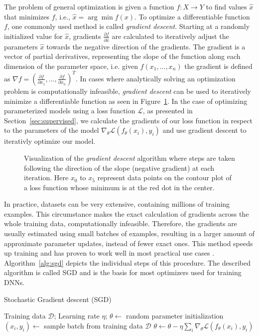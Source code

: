 The problem of general optimization is given a function $f: X \to  Y$ to find values $\hat{x}$ that minimizes $f$, i.e., $\hat{x} = \arg \min f(x)$.
To optimize a differentiable function $f$, one commonly used method is called \textit{gradient descent}. Starting at a randomly initialized value for $\hat{x}$, gradients $\frac{\partial f}{\partial \hat{x}}$ are calculated to iteratively adjust the parameters $\hat{x}$ towards the negative direction of the gradients. The gradient is a vector of partial derivatives, representing the slope of the function along each dimension of the parameter space, i.e. given $f(x_1,...,x_n)$ the gradient is defined as $\nabla f = \left(\frac{\partial f}{\partial x_1}, ..., \frac{\partial f}{\partial x_n} \right)^T$. In cases where analytically solving an optimization problem is computationally infeasible, \textit{gradient descent} can be used to iteratively minimize a differentiable function as seen in Figure~\ref{fig:gd}. In the case of optimizing parameterized models using a loss function $\mathcal{L}$, as presented in Section~\ref{sec:supervised}, we calculate the gradients of our loss function in respect to the parameters of the model $\nabla_\theta \mathcal{L}(f_\theta(x_i), y_i)$ and use gradient descent to iterativly optimize our model.
\begin{figure}[H]
	\centering
	
	\caption{Visualization of the \textit{gradient descent} algorithm where steps are taken following the direction of the slope (negative gradient) at each iteration. Here $x_0$ to $x_5$ represent data points on the contour plot of a loss function whose minimum is at the red dot in the center.}
	\label{fig:gd}
\end{figure}
In practice, datasets can be very extensive, containing millions of training examples. This circumstance makes the exact calculation of gradients across the whole training data, computationally infeasible. Therefore, the gradients are usually estimated using small batches of examples, resulting in a larger amount of approximate parameter updates, instead of fewer exact ones. This method speeds up training and has proven to work well in most practical use cases \parencite{shamir2013stochastic}. Algorithm~\ref{alg:sgd} depicts the individual steps of this procedure.  The described algorithm is called \ac{SGD} and is the basis for most optimizers used for training \acp{DNN}. 
\begin{algorithm}[H]
	\caption{Stochastic Gradient descent (SGD)}
	\label{alg:sgd}
	\begin{algorithmic}[1]
		\Require Training data $\mathcal{D}$;  Learning rate $\eta$;
		\State $\theta \gets$ random parameter initialization
		\Repeat
		\State $(x_i,y_i) \gets$ sample batch from training data $\mathcal{D}$
		\State $\theta \gets \theta - \eta \sum_i \nabla_\theta \mathcal{L}(f_\theta(x_i), y_i)$ \label{alg:sgd:update}
	\end{algorithmic}
\end{algorithm}
